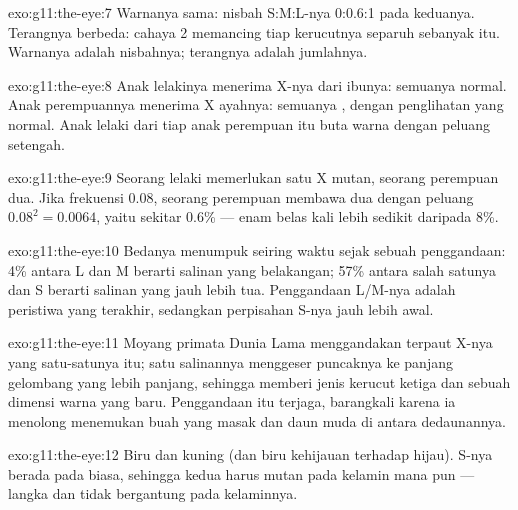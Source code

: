 \begin{solution}{exo:g11:the-eye:7}
Warnanya sama: nisbah S:M:L-nya 0:0.6:1 pada keduanya. Terangnya
berbeda: cahaya 2 memancing tiap kerucutnya separuh sebanyak itu.
Warnanya adalah nisbahnya; terangnya adalah jumlahnya.
\end{solution}

\begin{solution}{exo:g11:the-eye:8}
Anak lelakinya menerima  X-nya dari ibunya: semuanya normal.
Anak perempuannya menerima  X ayahnya: semuanya , dengan
penglihatan yang normal. Anak lelaki dari tiap anak perempuan 
itu buta warna dengan peluang setengah.
\end{solution}

\begin{solution}{exo:g11:the-eye:9}
Seorang lelaki memerlukan satu X mutan, seorang perempuan dua. Jika
frekuensi  0.08, seorang perempuan membawa dua dengan peluang
$0.08^2 = 0.0064$, yaitu sekitar 0.6\% --- enam belas kali lebih
sedikit daripada 8\%.
\end{solution}

\begin{solution}{exo:g11:the-eye:10}
Bedanya menumpuk seiring waktu sejak sebuah penggandaan: 4\% antara L
dan M berarti salinan yang belakangan; 57\% antara salah satunya dan S
berarti salinan yang jauh lebih tua. Penggandaan L/M-nya adalah
peristiwa yang terakhir, sedangkan perpisahan S-nya jauh lebih awal.
\end{solution}

\begin{solution}{exo:g11:the-eye:11}
Moyang primata Dunia Lama menggandakan   terpaut X-nya yang
satu-satunya itu; satu salinannya menggeser puncaknya ke panjang gelombang yang
lebih panjang, sehingga memberi jenis kerucut ketiga dan sebuah dimensi
warna yang baru. Penggandaan itu terjaga, barangkali karena ia menolong
menemukan buah yang masak dan daun muda di antara dedaunannya.
\end{solution}

\begin{solution}{exo:g11:the-eye:12}
Biru dan kuning (dan biru kehijauan terhadap hijau).  S-nya berada
pada  biasa, sehingga kedua  harus mutan pada kelamin
mana pun --- langka dan tidak bergantung pada kelaminnya.
\end{solution}

